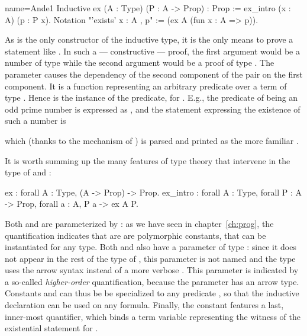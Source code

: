 \begin{coq}{name=Ande1}{}
Inductive ex (A : Type) (P : A -> Prop) : Prop :=
  ex_intro (x : A) (p : P x).
Notation "'exists' x : A , p" := (ex A (fun x : A => p)).
\end{coq}

As   is the only constructor of the  inductive
type, it is the only means to prove a statement like
.  In such a --- constructive --- proof, the first
argument would be a number
 of type  while the second argument would be a proof  of type
.  The parameter  causes the dependency of the
second component of the pair on the first component. It is a function
representing an arbitrary predicate over a term of
type .  Hence  is the instance of the predicate, for .  E.g.,
the predicate of being an odd prime number is expressed as
, and the statement expressing the
existence of such a number is

\centerline{} 
which (thanks to the  mechanism of \Coq{}) is parsed and
printed as the more familiar .

It is worth summing up the many features of type theory that
intervene in the type of  and :

\begin{coq}{}{}
ex : forall A : Type, (A -> Prop) -> Prop.
ex_intro : forall A : Type, forall P : A -> Prop, forall a : A, P a -> ex A P.
\end{coq}

Both  and  are parameterized by : as
we have seen in chapter~\ref{ch:prog}, the 
quantification indicates that  are  are polymorphic
constants, that can be instantiated for any type. Both  and
 also have a parameter of type  : since it
does not appear in the rest of the type of , this parameter is
not named and the type uses the arrow syntax instead of a more verbose
. This parameter is
indicated by a so-called \emph{higher-order} quantification, because
the parameter has an arrow type. Constants   and 
can thus be  be specialized to any predicate , so that the 
inductive declaration can be used on any formula. Finally, the
 constant features a last, inner-most 
quantifier, which binds a term variable  representing the witness
of the existential statement for .\\

